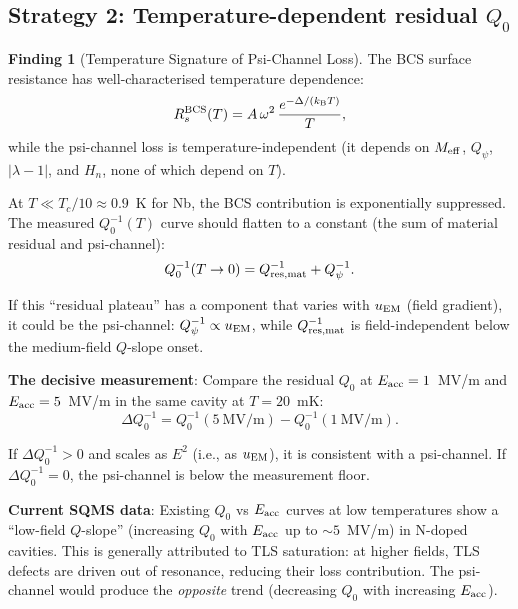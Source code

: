 \documentclass[11pt]{article}
\newcommand{\lam}{\lambda}
\newcommand{\Meff}{M_{\rm eff}}
\newcommand{\Qpsi}{Q_\psi}
\newcommand{\Heff}{H_n}
\newcommand{\lbone}{|\lam - 1|}
\theoremstyle{definition}
\newtheorem{finding}[theorem]{Finding}
\theoremstyle{remark}
\begin{document}
\subsection{Strategy 2: Temperature-dependent residual $Q_0$}

\begin{finding}[Temperature Signature of Psi-Channel Loss]
\label{find:temperature_signature}
The BCS surface resistance has well-characterised temperature
dependence:
\begin{equation}
R_s^{\rm BCS}(T) = A\,\omega^2\,\frac{e^{-\Delta/(k_{\rm B}T)}}{T},
\end{equation}
while the psi-channel loss is temperature-independent (it depends on
$\Meff$, $\Qpsi$, $\lbone$, and $\Heff$, none of which depend on $T$).

At $T \ll T_c/10 \approx 0.9$~K for Nb, the BCS contribution is
exponentially suppressed. The measured $Q_0^{-1}(T)$ curve should
flatten to a constant (the sum of material residual and psi-channel):
\begin{equation}
Q_0^{-1}(T \to 0) = Q_{\rm res,mat}^{-1} + Q_\psi^{-1}.
\end{equation}

If this ``residual plateau'' has a component that varies with
$u_{\rm EM}$ (field gradient), it could be the psi-channel:
$Q_\psi^{-1} \propto u_{\rm EM}$, while $Q_{\rm res,mat}^{-1}$ is
field-independent below the medium-field $Q$-slope onset.

\textbf{The decisive measurement}: Compare the residual $Q_0$ at
$E_{\rm acc} = 1$~MV/m and $E_{\rm acc} = 5$~MV/m in the same cavity
at $T = 20$~mK:
\begin{equation}
\Delta Q_0^{-1} = Q_0^{-1}(5~\text{MV/m}) - Q_0^{-1}(1~\text{MV/m}).
\end{equation}

If $\Delta Q_0^{-1} > 0$ and scales as $E^2$ (i.e., as $u_{\rm EM}$),
it is consistent with a psi-channel. If $\Delta Q_0^{-1} = 0$, the
psi-channel is below the measurement floor.

\textbf{Current SQMS data}: Existing $Q_0$ vs $E_{\rm acc}$ curves at
low temperatures show a ``low-field $Q$-slope'' (increasing $Q_0$ with
$E_{\rm acc}$ up to $\sim 5$~MV/m) in N-doped cavities. This is
generally attributed to TLS saturation: at higher fields, TLS defects
are driven out of resonance, reducing their loss contribution. The
psi-channel would produce the \emph{opposite} trend (decreasing $Q_0$
with increasing $E_{\rm acc}$).


\end{finding}
\end{document}
